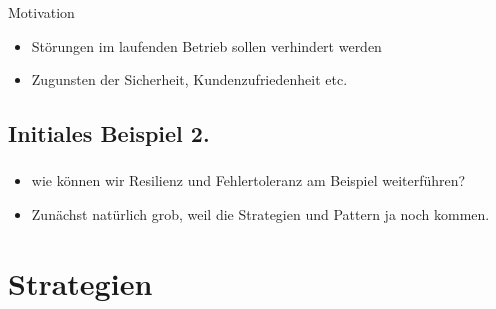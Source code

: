 \begin{frame}
    \frametitle{\insertsection}
    \framesubtitle{\insertsubsection}

    \begin{block}{Motivation}
        \begin{itemize}
            \item Störungen im laufenden Betrieb sollen verhindert werden
            \item Zugunsten der Sicherheit, Kundenzufriedenheit etc.
        \end{itemize}
    \end{block}
\end{frame}

%

\subsection{Initiales Beispiel 2.}

\begin{frame}
    \frametitle{\insertsection}
    \framesubtitle{\insertsubsection}

    \begin{itemize}
        \item wie können wir Resilienz und Fehlertoleranz am Beispiel weiterführen?
        \item Zunächst natürlich grob, weil die Strategien und Pattern ja noch kommen.
    \end{itemize}
\end{frame}


\section{Strategien}
